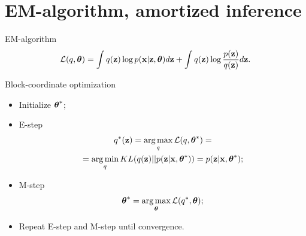 \section{EM-algorithm, amortized inference}
\begin{frame}{EM-algorithm}
	\[
		\mathcal{L} (q, \boldsymbol{\theta})  = \int q(\mathbf{z}) \log p(\mathbf{x} | \mathbf{z}, \boldsymbol{\theta}) d\mathbf{z} + \int q(\mathbf{z}) \log \frac{p(\mathbf{z})}{q(\mathbf{z})}d\mathbf{z}.
	\]
	\begin{block}{Block-coordinate optimization}
	\begin{itemize}
		\item Initialize $\boldsymbol{\theta}^*$;
		\item E-step
		\begin{multline*}
			q^*(\mathbf{z}) = \operatorname*{arg\,max}_q \mathcal{L} (q, \boldsymbol{\theta}^*) = \\
			= \operatorname*{arg\,min}_q KL(q(\mathbf{z}) || p(\mathbf{z} | \mathbf{x}, \boldsymbol{\theta}^*)) = p(\mathbf{z}| \mathbf{x}, \boldsymbol{\theta}^*);
		\end{multline*}
		\item M-step
		\[
			\boldsymbol{\theta}^* = \operatorname*{arg\,max}_{\boldsymbol{\theta}} \mathcal{L} (q^*, \boldsymbol{\theta});
		\]
		\item Repeat E-step and M-step until convergence.
	\end{itemize}
	\end{block}
\end{frame}
